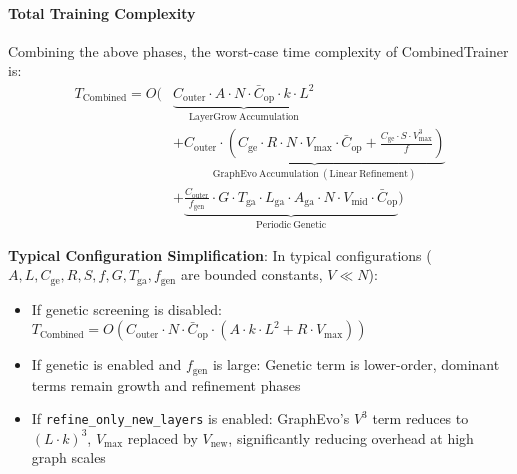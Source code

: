 \paragraph{Total Training Complexity}
Combining the above phases, the worst-case time complexity of CombinedTrainer is:
\begin{equation}
\begin{aligned}
    T_{\mathrm{Combined}} = O(&\underbrace{C_{\mathrm{outer}} \cdot A \cdot N \cdot \bar{C}_{\mathrm{op}} \cdot k \cdot L^2}_{\mathrm{LayerGrow\ Accumulation}} \\
    &+ \underbrace{C_{\mathrm{outer}} \cdot \left( C_{\mathrm{ge}} \cdot R \cdot N \cdot V_{\max} \cdot \bar{C}_{\mathrm{op}} + \frac{C_{\mathrm{ge}} \cdot S \cdot V_{\max}^3}{f} \right)}_{\mathrm{GraphEvo\ Accumulation\ (Linear\ Refinement)}} \\
    &+ \underbrace{\frac{C_{\mathrm{outer}}}{f_{\mathrm{gen}}} \cdot G \cdot T_{\mathrm{ga}} \cdot L_{\mathrm{ga}} \cdot A_{\mathrm{ga}} \cdot N \cdot V_{\mathrm{mid}} \cdot \bar{C}_{\mathrm{op}}}_{\mathrm{Periodic\ Genetic}})
\end{aligned}
\end{equation}

\textbf{Typical Configuration Simplification}: In typical configurations ($A, L, C_{\mathrm{ge}}, R, S, f, G, T_{\mathrm{ga}}, f_{\mathrm{gen}}$ are bounded constants, $V \ll N$):
\begin{itemize}
    \item If genetic screening is disabled: $T_{\mathrm{Combined}} = O(C_{\mathrm{outer}} \cdot N \cdot \bar{C}_{\mathrm{op}} \cdot (A \cdot k \cdot L^2 + R \cdot V_{\max}))$
    \item If genetic is enabled and $f_{\mathrm{gen}}$ is large: Genetic term is lower-order, dominant terms remain growth and refinement phases
    \item If \texttt{refine\_only\_new\_layers} is enabled: GraphEvo's $V^3$ term reduces to $(L \cdot k)^3$, $V_{\max}$ replaced by $V_{\mathrm{new}}$, significantly reducing overhead at high graph scales
\end{itemize}

